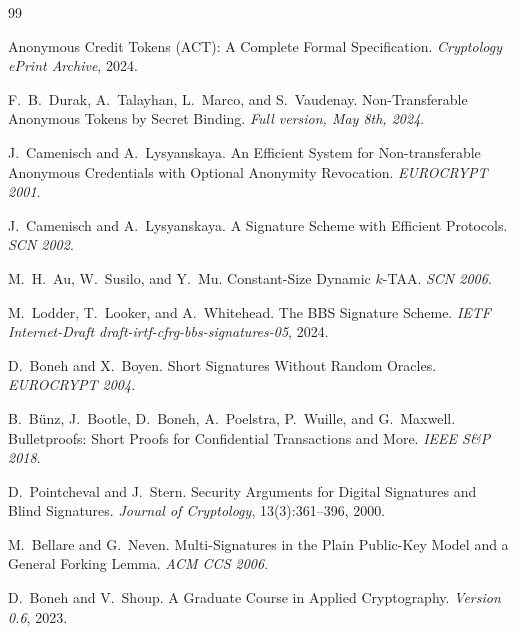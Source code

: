 \documentclass[11pt]{article}
\theoremstyle{definitionstyle}
\theoremstyle{plain}
\begin{document}

\begin{thebibliography}{99}

Anonymous Credit Tokens (ACT): A Complete Formal Specification.
\emph{Cryptology ePrint Archive}, 2024.

F.~B.~Durak, A.~Talayhan, L.~Marco, and S.~Vaudenay.
Non-Transferable Anonymous Tokens by Secret Binding.
\emph{Full version, May 8th, 2024}.

J.~Camenisch and A.~Lysyanskaya.
An Efficient System for Non-transferable Anonymous Credentials with Optional Anonymity Revocation.
\emph{EUROCRYPT 2001}.

J.~Camenisch and A.~Lysyanskaya.
A Signature Scheme with Efficient Protocols.
\emph{SCN 2002}.

M.~H.~Au, W.~Susilo, and Y.~Mu.
Constant-Size Dynamic $k$-TAA.
\emph{SCN 2006}.

M.~Lodder, T.~Looker, and A.~Whitehead.
The BBS Signature Scheme.
\emph{IETF Internet-Draft draft-irtf-cfrg-bbs-signatures-05}, 2024.

D.~Boneh and X.~Boyen.
Short Signatures Without Random Oracles.
\emph{EUROCRYPT 2004}.

B.~B{\"u}nz, J.~Bootle, D.~Boneh, A.~Poelstra, P.~Wuille, and G.~Maxwell.
Bulletproofs: Short Proofs for Confidential Transactions and More.
\emph{IEEE S\&P 2018}.

D.~Pointcheval and J.~Stern.
Security Arguments for Digital Signatures and Blind Signatures.
\emph{Journal of Cryptology}, 13(3):361--396, 2000.

M.~Bellare and G.~Neven.
Multi-Signatures in the Plain Public-Key Model and a General Forking Lemma.
\emph{ACM CCS 2006}.

D.~Boneh and V.~Shoup.
A Graduate Course in Applied Cryptography.
\emph{Version 0.6}, 2023.

\end{thebibliography}
\end{document}
